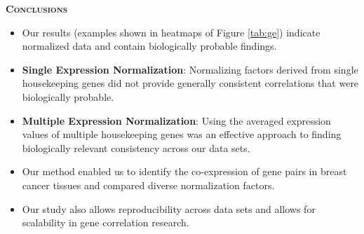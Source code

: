 \documentclass[final,t]{beamer}
\begin{document}
\begin{frame}{}
\begin{columns}
\begin{column}{.5\linewidth}
\begin{block}{\textsc{\textbf{Conclusions}}}
		\begin{itemize}
				\item Our results (examples shown in heatmaps of Figure \ref{tab:ge}) indicate normalized data and contain biologically probable findings.
                    	\item \textbf{Single Expression Normalization}:  Normalizing factors derived from single housekeeping genes did not provide generally consistent correlations that were biologically probable.
				\item \textbf{Multiple Expression Normalization}: Using the averaged expression values of multiple housekeeping genes was an effective approach to finding biologically relevant consistency across our data sets.
			\item Our method enabled us to identify the co-expression of gene pairs in breast cancer tissues and compared diverse normalization factors.
			\item Our study also allows reproducibility across data sets and allows for scalability in gene correlation research. 
		\end{itemize}
		\vspace*{3mm}
	\end{block}
	\end{column}


	\end{columns}
	\end{frame}
\end{document}
